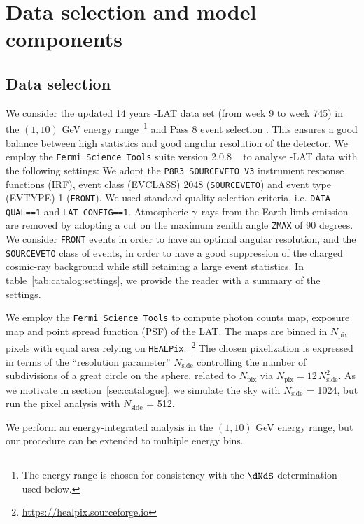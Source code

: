 \section{Data selection and model components}
\label{sec:catalog:data}
\subsection{Data selection}
We consider the updated 14 years \Fermi-LAT data set (from week 9 to week 745) in the $(1,10)$ GeV energy range~\footnote{The energy range is chosen for consistency with the $\dNdS$ determination used below.} and Pass 8 event selection \cite{Fermi-LAT:2013jgq,Bruel:2018lac}. This ensures a good balance between high statistics and good angular resolution of the detector. We employ the \texttt{Fermi Science Tools} suite version 2.0.8 ~\cite{Fermitools} to analyse \Fermi-LAT data with the following settings: 
We adopt the \verb|P8R3_SOURCEVETO_V3| instrument response functions (IRF), event class (EVCLASS) 2048 (\texttt{SOURCEVETO}) and event type (EVTYPE) 1 (\verb|FRONT|). We used standard quality selection criteria, i.e. \verb|DATA QUAL==1| and \verb|LAT CONFIG==1|.
Atmospheric $\gamma$~rays from the Earth limb emission are removed by adopting a cut on the maximum zenith angle \texttt{ZMAX} of 90 degrees. We consider \verb|FRONT| events in order to have an optimal angular resolution, and the \texttt{SOURCEVETO} class of events, in order to have a good suppression of the charged cosmic-ray background while still retaining a large event statistics. 
In table~\ref{tab:catalog:settings}, we provide the reader with  a summary of the settings.
%

We employ the \texttt{Fermi Science Tools} to compute photon counts map, exposure map and point spread function (PSF) of the LAT.
%
The maps are binned in $N_\textrm{pix}$ pixels with equal area  relying on \texttt{HEALPix}.~\footnote{\href{https://healpix.sourceforge.io}{https://healpix.sourceforge.io}} The chosen pixelization is expressed in terms of the ``resolution parameter'' $N_\textrm{side}$ controlling the number of subdivisions of a great circle on the sphere, related to $N_\textrm{pix}$ via $N_\textrm{pix}=12 \, N_\textrm{side}^2$. 
%
As we  motivate in section~\ref{sec:catalogue}, we simulate the sky
with $N_\textrm{side}$ = 1024, but run the pixel analysis with $N_\textrm{side}$ = 512. 
%

We perform an energy-integrated analysis in the $(1,10)$ GeV energy range, but our procedure can be  extended to multiple energy bins.

